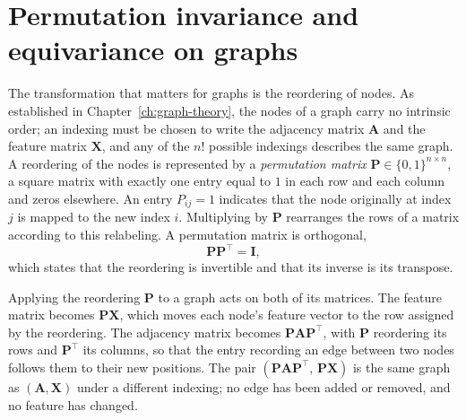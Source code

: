 \section{Permutation invariance and equivariance on graphs}
\label{sec:permutation}

The transformation that matters for graphs is the reordering of nodes. As
established in Chapter~\ref{ch:graph-theory}, the nodes of a graph carry no
intrinsic order; an indexing must be chosen to write the adjacency matrix
$\mathbf{A}$ and the feature matrix $\mathbf{X}$, and any of the $n!$ possible
indexings describes the same graph. A reordering of the nodes is represented by
a \textit{permutation matrix} $\mathbf{P} \in \{0,1\}^{n \times n}$, a square
matrix with exactly one entry equal to $1$ in each row and each column and zeros
elsewhere. An entry $P_{ij}=1$ indicates that the node originally at index $j$ is mapped to
the new index $i$. Multiplying by $\mathbf{P}$ rearranges the rows of a matrix 
according to this relabeling. A permutation matrix is orthogonal,
\begin{equation}
  \mathbf{P}\mathbf{P}^\top = \mathbf{I},
  \label{eq:permutation-orthogonal}
\end{equation}
which states that the reordering is invertible and that its inverse is its
transpose.

Applying the reordering $\mathbf{P}$ to a graph acts on both of its matrices.
The feature matrix becomes $\mathbf{P}\mathbf{X}$, which moves each node's
feature vector to the row assigned by the reordering. The adjacency matrix
becomes $\mathbf{P}\mathbf{A}\mathbf{P}^\top$, with $\mathbf{P}$ reordering its
rows and $\mathbf{P}^\top$ its columns, so that the entry recording an edge
between two nodes follows them to their new positions. The pair
$(\mathbf{P}\mathbf{A}\mathbf{P}^\top,\, \mathbf{P}\mathbf{X})$ is the same graph
as $(\mathbf{A}, \mathbf{X})$ under a different indexing; no edge has been added
or removed, and no feature has changed.

